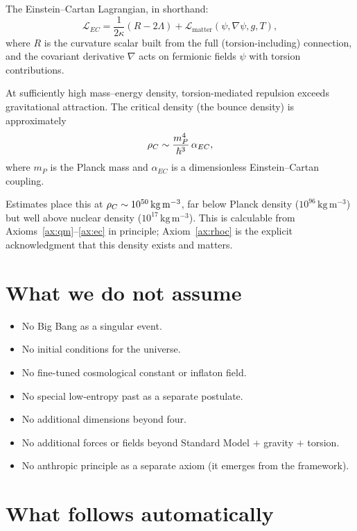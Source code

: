 \noindent The Einstein--Cartan Lagrangian, in shorthand:
\[
  \mathcal{L}_{EC} = \frac{1}{2\kappa}(R - 2\Lambda)
  + \mathcal{L}_{\text{matter}}(\psi, \nabla\psi, g, T),
\]
where $R$ is the curvature scalar built from the full (torsion-including)
connection, and the covariant derivative $\nabla$ acts on fermionic fields
$\psi$ with torsion contributions.

\begin{axiom}\label{ax:rhoc}
At sufficiently high mass--energy density, torsion-mediated repulsion exceeds
gravitational attraction. The critical density (the bounce density) is
approximately
\[
  \rho_{C} \sim \frac{m_P^4}{\hbar^3}\,\alpha_{EC},
\]
where $m_P$ is the Planck mass and $\alpha_{EC}$ is a dimensionless
Einstein--Cartan coupling.
\end{axiom}

\noindent Estimates place this at
$\rho_{C} \sim 10^{50}\,\mathrm{kg\,m^{-3}}$, far below Planck density
($10^{96}\,\mathrm{kg\,m^{-3}}$) but well above nuclear density
($10^{17}\,\mathrm{kg\,m^{-3}}$). This is calculable from
Axioms~\ref{ax:qm}--\ref{ax:ec} in principle; Axiom~\ref{ax:rhoc} is the
explicit acknowledgment that this density exists and matters.

\section{What we do not assume}

\begin{itemize}
  \item No Big Bang as a singular event.
  \item No initial conditions for the universe.
  \item No fine-tuned cosmological constant or inflaton field.
  \item No special low-entropy past as a separate postulate.
  \item No additional dimensions beyond four.
  \item No additional forces or fields beyond Standard Model $+$ gravity $+$ torsion.
  \item No anthropic principle as a separate axiom (it emerges from the framework).
\end{itemize}

\section{What follows automatically}

